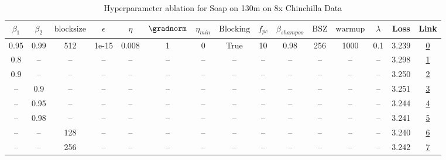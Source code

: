 \begin{table}[H]
\centering
\caption{Hyperparameter ablation for Soap on 130m on 8x Chinchilla Data}
\label{tab:ablation_soap_130m_on_8x_chinchilla_data}
\begin{tabular}{ccccccccccccccc}
\toprule
$\beta_1$ & $\beta_2$ & $\mathrm{block size}$ & $\epsilon$ & $\eta$ & $\gradnorm$ & $\eta_{min}$ & $\mathrm{Blocking}$ & $f_{pc}$ & $\beta_{shampoo}$ & $\mathrm{BSZ}$ & $\mathrm{warmup}$ & $\lambda$ & Loss & Link \\
\midrule
0.95 & 0.99 & 512 & 1e-15 & 0.008 & 1 & 0 & True & 10 & 0.98 & 256 & 1000 & 0.1 & 3.239 & \href{https://wandb.ai/stanford-mercury/optimizer-scaling/runs/sweep-130m-21B-soape2479ablr0.008-wd0.1-minlr0-warmup1000-b10.95-a17efa}{0} \\
\midrule
0.8 & -- & -- & -- & -- & -- & -- & -- & -- & -- & -- & -- & -- & 3.298 & \href{https://wandb.ai/stanford-mercury/optimizer-scaling/runs/sweep-130m-21B-soape2d8ee9lr0.008-wd0.1-minlr0-warmup1000-b10.8--cbb0fb}{1} \\
0.9 & -- & -- & -- & -- & -- & -- & -- & -- & -- & -- & -- & -- & 3.250 & \href{https://wandb.ai/stanford-mercury/optimizer-scaling/runs/sweep-130m-21B-soape5dcf61lr0.008-wd0.1-minlr0-warmup1000-b10.9--69f18f}{2} \\
-- & 0.9 & -- & -- & -- & -- & -- & -- & -- & -- & -- & -- & -- & 3.251 & \href{https://wandb.ai/stanford-mercury/optimizer-scaling/runs/sweep-130m-21B-soape812156lr0.008-wd0.1-minlr0-warmup1000-b10.95-a40bb0}{3} \\
-- & 0.95 & -- & -- & -- & -- & -- & -- & -- & -- & -- & -- & -- & 3.244 & \href{https://wandb.ai/stanford-mercury/optimizer-scaling/runs/sweep-130m-21B-soape28447clr0.008-wd0.1-minlr0-warmup1000-b10.95-fe0c4b}{4} \\
-- & 0.98 & -- & -- & -- & -- & -- & -- & -- & -- & -- & -- & -- & 3.241 & \href{https://wandb.ai/stanford-mercury/optimizer-scaling/runs/sweep-130m-21B-soape111b71lr0.008-wd0.1-minlr0-warmup1000-b10.95-80abaa}{5} \\
-- & -- & 128 & -- & -- & -- & -- & -- & -- & -- & -- & -- & -- & 3.240 & \href{https://wandb.ai/stanford-mercury/optimizer-scaling/runs/sweep-130m-21B-soapebbce2flr0.008-wd0.1-minlr0-warmup1000-b10.95-d9c8f1}{6} \\
-- & -- & 256 & -- & -- & -- & -- & -- & -- & -- & -- & -- & -- & 3.242 & \href{https://wandb.ai/stanford-mercury/optimizer-scaling/runs/sweep-130m-21B-soape0e8fddlr0.008-wd0.1-minlr0-warmup1000-b10.95-b0e218}{7} \\

\end{tabular}
\end{table}
